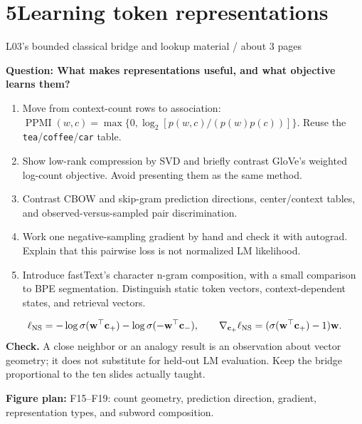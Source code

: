 \documentclass[11pt,a4paper]{article}
\newcommand{\sectionplan}[3]{%
  \section{\texorpdfstring{#1\quad #2}{#1 #2}}
  {\small\color{muted}#3\par}}
\newcommand{\tagline}[1]{\textcolor{courseblue}{\textbf{#1}}}
\newcommand{\figids}[1]{\textcolor{courseteal}{\textbf{Figure plan:} #1}}
\begin{document}
\clearpage
\sectionplan{5}{Learning token representations}{L03's bounded classical bridge and lookup material \quad / \quad about 3 pages}
\tagline{Question: What makes representations useful, and what objective learns them?}
\begin{enumerate}
  \item Move from context-count rows to association:
  $\operatorname{PPMI}(w,c)=\max\{0,\log_2[p(w,c)/(p(w)p(c))]\}$.
  Reuse the \texttt{tea}/\texttt{coffee}/\texttt{car} table.
  \item Show low-rank compression by SVD and briefly contrast GloVe's
  weighted log-count objective. Avoid presenting them as the same method.
  \item Contrast CBOW and skip-gram prediction directions, center/context
  tables, and observed-versus-sampled pair discrimination.
  \item Work one negative-sampling gradient by hand and check it with
  autograd. Explain that this pairwise loss is not normalized LM likelihood.
  \item Introduce fastText's character n-gram composition, with a small
  comparison to BPE segmentation. Distinguish static token vectors,
  context-dependent states, and retrieval vectors.
\end{enumerate}
\[
\ell_{\rm NS}=-\log\sigma(\mathbf w^\top\mathbf c_+)
             -\log\sigma(-\mathbf w^\top\mathbf c_-),\qquad
\nabla_{\mathbf c_+}\ell_{\rm NS}
=(\sigma(\mathbf w^\top\mathbf c_+)-1)\mathbf w .
\]
\textbf{Check.} A close neighbor or an analogy result is an observation
about vector geometry; it does not substitute for held-out LM evaluation.
Keep the bridge proportional to the ten slides actually taught.

\figids{F15--F19: count geometry, prediction direction, gradient,
representation types, and subword composition.}
\end{document}
